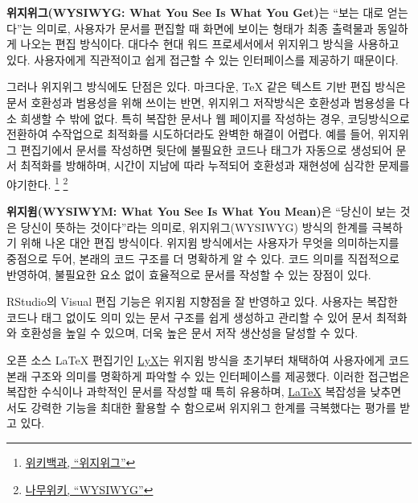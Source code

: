 \documentclass[
  letterpaper,
]{book}
\begin{document}
\textbf{위지위그(WYSIWYG: What You See Is What You Get)}는 ``보는 대로
얻는다''는 의미로, 사용자가 문서를 편집할 때 화면에 보이는 형태가 최종
출력물과 동일하게 나오는 편집 방식이다. 대다수 현대 워드 프로세서에서
위지위그 방식을 사용하고 있다. 사용자에게 직관적이고 쉽게 접근할 수 있는
인터페이스를 제공하기 때문이다.

그러나 위지위그 방식에도 단점은 있다. 마크다운, TeX 같은 텍스트 기반
편집 방식은 문서 호환성과 범용성을 위해 쓰이는 반면, 위지위그 저작방식은
호환성과 범용성을 다소 희생할 수 밖에 없다. 특히 복잡한 문서나 웹
페이지를 작성하는 경우, 코딩방식으로 전환하여 수작업으로 최적화를
시도하더라도 완벽한 해결이 어렵다. 예를 들어, 위지위그 편집기에서 문서를
작성하면 뒷단에 불필요한 코드나 태그가 자동으로 생성되어 문서 최적화를
방해하며, 시간이 지남에 따라 누적되어 호환성과 재현성에 심각한 문제를
야기한다. \footnote{\href{https://ko.wikipedia.org/wiki/\%EC\%9C\%84\%EC\%A7\%80\%EC\%9C\%84\%EA\%B7\%B8}{위키백과,
  ``위지위그''}} \footnote{\href{https://namu.wiki/w/WYSIWYG}{나무위키,
  ``WYSIWYG''}}

\textbf{위지윔(WYSIWYM: What You See Is What You Mean)}은 ``당신이 보는
것은 당신이 뜻하는 것이다''라는 의미로, 위지위그(WYSIWYG) 방식의 한계를
극복하기 위해 나온 대안 편집 방식이다. 위지윔 방식에서는 사용자가 무엇을
의미하는지를 중점으로 두어, 본래의 코드 구조를 더 명확하게 알 수 있다.
코드 의미를 직접적으로 반영하여, 불필요한 요소 없이 효율적으로 문서를
작성할 수 있는 장점이 있다.

RStudio의 Visual 편집 기능은 위지윔 지향점을 잘 반영하고 있다. 사용자는
복잡한 코드나 태그 없이도 의미 있는 문서 구조를 쉽게 생성하고 관리할 수
있어 문서 최적화와 호환성을 높일 수 있으며, 더욱 높은 문서 저작 생산성을
달성할 수 있다.

오픈 소스 LaTeX 편집기인 \href{https://www.lyx.org/}{LyX}는 위지윔
방식을 초기부터 채택하여 사용자에게 코드 본래 구조와 의미를 명확하게
파악할 수 있는 인터페이스를 제공했다. 이러한 접근법은 복잡한 수식이나
과학적인 문서를 작성할 때 특히 유용하며,
\href{http://example.org}{\LaTeX} 복잡성을 낮추면서도 강력한 기능을
최대한 활용할 수 함으로써 위지위그 한계를 극복했다는 평가를 받고 있다.
\end{document}
